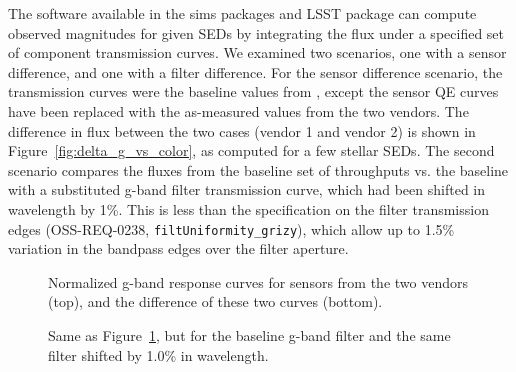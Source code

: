 \documentclass[DM,toc,lsstdraft]{lsstdoc}
\begin{document}
The software available in the sims packages and LSST  package
can compute observed magnitudes for given SEDs by integrating the flux under a
specified set of component transmission curves. We examined two scenarios, one
with a sensor difference, and one with a filter difference. For the sensor
difference scenario, the transmission curves were the baseline values from
, except the sensor QE curves have been replaced with the
as-measured values from the two vendors. The difference in flux between the two
cases (vendor 1 and vendor 2) is shown in Figure~\ref{fig:delta_g_vs_color}, as
computed for a few stellar SEDs. The second scenario compares the fluxes from
the baseline set of throughputs vs. the baseline with a substituted g-band
filter transmission curve, which had been shifted in wavelength by 1\%. This is
less than the specification on the filter transmission edges (OSS-REQ-0238,
\texttt{filtUniformity\_grizy}), which allow up to 1.5\% variation
in the bandpass edges over the filter aperture.

\begin{figure}
\caption{Normalized g-band response curves for sensors from the two vendors
(top), and the difference of these two curves (bottom).
\label{fig:QE_response_curves}
}
\end{figure}

\begin{figure}
\caption{Same as Figure~\ref{fig:QE_response_curves}, but for the baseline
g-band filter and the same filter shifted by 1.0\% in wavelength.
\label{fig:filter_response_curves}
}
\end{figure}
\end{document}
